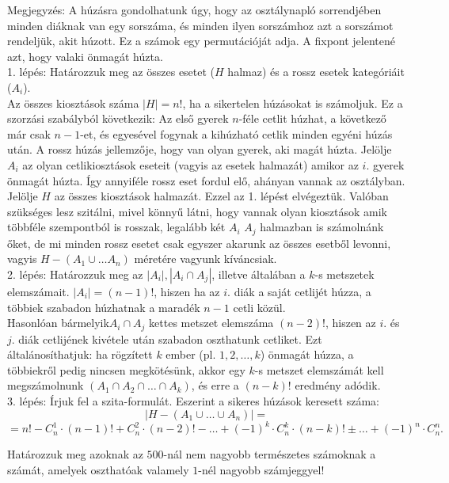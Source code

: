 \begin{solution}
Megjegyzés: A húzásra gondolhatunk úgy, hogy az osztálynapló sorrendjében
minden diáknak van egy sorszáma, és minden ilyen sorszámhoz azt a
sorszámot rendeljük, akit húzott. Ez a számok egy permutációját adja.
A fixpont jelentené azt, hogy valaki önmagát húzta.\\

1. lépés: Határozzuk meg az összes esetet ($H$ halmaz) és a rossz
esetek kategóriáit ($A_{i}$).\\

Az összes kiosztások száma $|H|=n!$, ha a sikertelen húzásokat is
számoljuk. Ez a szorzási szabályból következik: Az első gyerek $n$-féle
cetlit húzhat, a következő már csak $n-1$-et, és egyesével fogynak
a kihúzható cetlik minden egyéni húzás után. A rossz húzás jellemzője,
hogy van olyan gyerek, aki magát húzta. Jelölje $A_{i}$ az olyan
cetlikiosztások eseteit (vagyis az esetek halmazát) amikor az $i$.
gyerek önmagát húzta. Így annyiféle rossz eset fordul elő, ahányan
vannak az osztályban.\\

Jelölje $H$ az összes kiosztások halmazát. Ezzel az 1. lépést elvégeztük.
Valóban szükséges lesz szitálni, mivel könnyű látni, hogy vannak olyan
kiosztások amik többféle szempontból is rosszak, legalább két $A_{i}$
$A_{j}$ halmazban is számolnánk őket, de mi minden rossz esetet csak
egyszer akarunk az összes esetből levonni, vagyis $H-(A_{1}\cup\dots A_{n})$
méretére vagyunk kíváncsiak.\\

2. lépés: Határozzuk meg az $|A_{i}|,|A_{i}\cap A_{j}|$, illetve
általában a $k$-s metszetek elemszámait. $|A_{i}|=(n-1)!$, hiszen
ha az $i$. diák a saját cetlijét húzza, a többiek szabadon húzhatnak
a maradék $n-1$ cetli közül.\\

Hasonlóan bármelyik$A_{i}\cap A_{j}$ kettes metszet elemszáma $(n-2)!$,
hiszen az $i$. és $j$. diák cetlijének kivétele után szabadon oszthatunk
cetliket. Ezt általánosíthatjuk: ha rögzített $k$ ember (pl. $1,2,\dots,k$)
önmagát húzza, a többiekről pedig nincsen megkötésünk, akkor egy $k$-s
metszet elemszámát kell megszámolnunk $(A_{1}\cap A_{2}\cap\dots\cap A_{k})$,
és erre a $(n-k)!$ eredmény adódik.\\

3. lépés: Írjuk fel a szita-formulát. Eszerint a sikeres húzások keresett
száma: 
\[
|H-(A_{1}\cup\dots\cup A_{n})|=
\]
\[
=n!-C_{n}^{1}\cdot(n-1)!+C_{n}^{2}\cdot(n-2)!-\dots+(-1)^{k}\cdot C_{n}^{k}\cdot(n-k)!\pm\dots+(-1)^{n}\cdot C_{n}^{n}.
\]
\end{solution}
\begin{extraproblem}
Határozzuk meg azoknak az $500$-nál nem nagyobb természetes számoknak
a számát, amelyek oszthatóak valamely $1$-nél nagyobb számjeggyel! 
\end{extraproblem}

